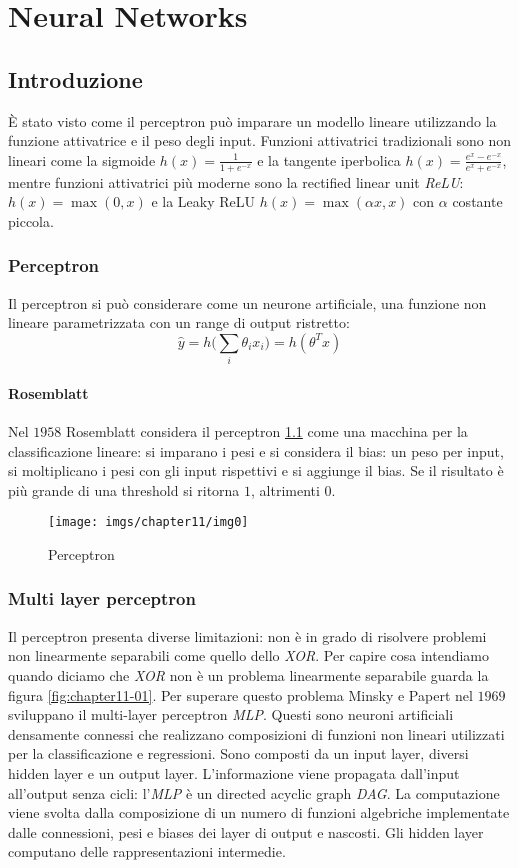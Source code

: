 \chapter{Neural Networks}

\section{Introduzione}
\`E stato visto come il perceptron pu\`o imparare un modello lineare utilizzando la funzione attivatrice e il peso degli input.
Funzioni attivatrici tradizionali sono non lineari come la sigmoide $h(x) = \frac{1}{1+e^{-x}}$ e la tangente iperbolica $h(x) = \frac{e^x-e^{-x}}{e^x+e^{-x}}$, mentre funzioni attivatrici pi\`u moderne sono la rectified linear unit \emph{ReLU}: $h(x) = \max(0,x)$ e la Leaky ReLU $h(x) = \max(\alpha x,x)$ con $\alpha$ costante piccola.

\subsection{Perceptron}
Il perceptron si pu\`o considerare come un neurone artificiale, una funzione non lineare parametrizzata con un range di output ristretto:
$$\hat{y} = h\bigl(\sum\limits_i\theta_ix_i\bigr) = h(\theta^Tx)$$

\subsubsection{Rosemblatt}
Nel $1958$ Rosemblatt considera il perceptron \ref{fig:chapter11-00} come una macchina per la classificazione lineare: si imparano i pesi e si considera il bias: un peso per input, si moltiplicano i pesi con gli input rispettivi e si aggiunge il bias.
Se il risultato \`e pi\`u grande di una threshold si ritorna $1$, altrimenti $0$.

\begin{figure}
	\centering
	\texttt{[image: imgs/chapter11/img0]}
	\caption{Perceptron}
	\label{fig:chapter11-00}
\end{figure}

	\subsection{Multi layer perceptron}
	Il perceptron presenta diverse limitazioni: non \`e in grado di risolvere problemi non linearmente separabili come quello dello \emph{XOR}. 
	Per capire cosa intendiamo quando diciamo che \emph{XOR} non \`e un problema linearmente separabile guarda la figura \ref{fig:chapter11-01}.
	Per superare questo problema Minsky e Papert nel $1969$ sviluppano il multi-layer perceptron \emph{MLP}.
	Questi sono neuroni artificiali densamente connessi che realizzano composizioni di funzioni non lineari utilizzati per la classificazione e regressioni.
	Sono composti da un input layer, diversi hidden layer e un output layer.
	L'informazione viene propagata dall'input all'output senza cicli: l'\emph{MLP} \`e un directed acyclic graph \emph{DAG}.
	La computazione viene svolta dalla composizione di un numero di funzioni algebriche implementate dalle connessioni, pesi e biases dei layer di output e nascosti.
	Gli hidden layer computano delle rappresentazioni intermedie.

